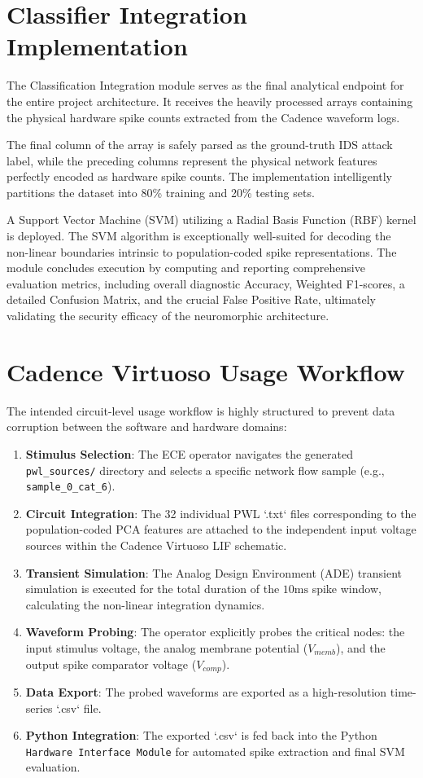 \section{Classifier Integration Implementation}

The Classification Integration module serves as the final analytical endpoint for the entire project architecture. It receives the heavily processed arrays containing the physical hardware spike counts extracted from the Cadence waveform logs.

The final column of the array is safely parsed as the ground-truth IDS attack label, while the preceding columns represent the physical network features perfectly encoded as hardware spike counts. The implementation intelligently partitions the dataset into 80\% training and 20\% testing sets. 

A Support Vector Machine (SVM) utilizing a Radial Basis Function (RBF) kernel is deployed. The SVM algorithm is exceptionally well-suited for decoding the non-linear boundaries intrinsic to population-coded spike representations. The module concludes execution by computing and reporting comprehensive evaluation metrics, including overall diagnostic Accuracy, Weighted F1-scores, a detailed Confusion Matrix, and the crucial False Positive Rate, ultimately validating the security efficacy of the neuromorphic architecture.

\section{Cadence Virtuoso Usage Workflow}

The intended circuit-level usage workflow is highly structured to prevent data corruption between the software and hardware domains:
\begin{enumerate}
\item \textbf{Stimulus Selection}: The ECE operator navigates the generated \texttt{pwl\_sources/} directory and selects a specific network flow sample (e.g., \texttt{sample\_0\_cat\_6}).
\item \textbf{Circuit Integration}: The 32 individual PWL `.txt` files corresponding to the population-coded PCA features are attached to the independent input voltage sources within the Cadence Virtuoso LIF schematic.
\item \textbf{Transient Simulation}: The Analog Design Environment (ADE) transient simulation is executed for the total duration of the $10\text{ms}$ spike window, calculating the non-linear integration dynamics.
\item \textbf{Waveform Probing}: The operator explicitly probes the critical nodes: the input stimulus voltage, the analog membrane potential ($V_{memb}$), and the output spike comparator voltage ($V_{comp}$).
\item \textbf{Data Export}: The probed waveforms are exported as a high-resolution time-series `.csv` file.
\item \textbf{Python Integration}: The exported `.csv` is fed back into the Python \texttt{Hardware Interface Module} for automated spike extraction and final SVM evaluation.
\end{enumerate}

